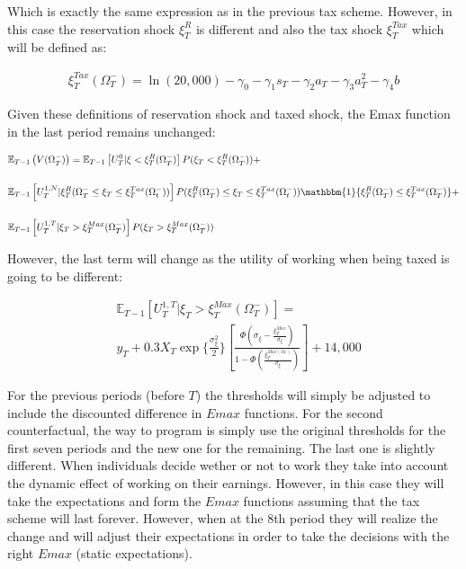 \documentclass[11pt]{article}
\begin{document}
Which is exactly the same expression as in the previous tax scheme. However, in this case the reservation shock $\xi_T^R$ is different and also the tax shock $\xi_T^{Tax}$ which will be defined as:

\begin{align}\label{eq:xitax}
	\xi_T^{Tax}(\Omega_T^-)=\ln(20,000)-\gamma_0-\gamma_1s_T-\gamma_2a_{T}-\gamma_3a_{T}^2-\gamma_4b
\end{align}

Given these definitions of reservation shock and taxed shock, the Emax function in the last period remains unchanged:

\begin{align}
	& \mathbb{E}_{T-1}\left(V(\Omega_T^-) \right)=\mathbb{E}_{T-1}\left[U_T^{0}| \xi<\xi_T^R(\Omega_T^-) \right]P(\xi_T<\xi_T^R(\Omega_T^-) )+\nonumber \\[0.2in]
	& \mathbb{E}_{T-1}\left[U_T^{1,N}| \xi_T^R(\Omega_T^-\leq \xi_T\leq \xi_T^{Tax}(\Omega_t^-)) \right]P(\xi_T^R(\Omega_T^-)\leq \xi_T\leq \xi_T^{Tax}(\Omega_t^-)) \mathbbm{1}\{\xi_T^R(\Omega_T^-)\leq\xi_T^{Tax}(\Omega_T^-)\}+\nonumber \\[0.2in]
	& \mathbb{E}_{T-1}\left[U_T^{1,T}| \xi_T>\xi_T^{Max}(\Omega_T^-) \right]P(\xi_T>\xi_T^{Max}(\Omega_T^-))
\end{align}

However, the last term will change as the utility of working when being taxed is going to be different:


\begin{align}
 	& \mathbb{E}_{T-1}\left[U_T^{1,T}| \xi_T>\xi_T^{Max}(\Omega_T^-) \right]=\nonumber \\[0.2in]
	& y_T+0.3X_T\exp\{\frac{\sigma_\xi^2}{2}\}\left[\frac{\Phi\left(\sigma_\xi-\frac{\xi_T^{Max}}{\sigma_\xi}\right)}{1-\Phi\left( \frac{\xi_T^{Max(\Omega_T^-)}}{\sigma_\xi} \right) } \right]+14,000
\end{align}

For the previous periods (before $T$) the thresholds will simply be adjusted to include the discounted difference in $Emax$ functions. For the second counterfactual, the way to program is simply use the original thresholds for the first seven periods and the new one for the remaining. The last one is slightly different. When individuals decide wether or not to work they take into account the dynamic effect of working on their earnings. However, in this case they will take the expectations and form the $Emax$ functions assuming that the tax scheme will last forever. However, when at the 8th period they will realize the change and will adjust their expectations in order to take the decisions with the right $Emax$  (static expectations). 
\end{document}
